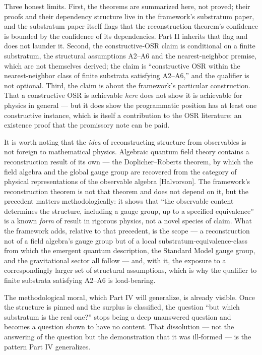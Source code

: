 \documentclass[
]{article}
\begin{document}
Three honest limits. First, the theorems are summarized here, not
proved; their proofs and their dependency structure live in the
framework's substratum paper, and the substratum paper itself flags that
the reconstruction theorem's confidence is bounded by the confidence of
its dependencies. Part II inherits that flag and does not launder it.
Second, the constructive-OSR claim is conditional on a finite
substratum, the structural assumptions A2--A6 and the nearest-neighbor
premise, which are not themselves derived; the claim is ``constructive
OSR within the nearest-neighbor class of finite substrata satisfying
A2--A6,'' and the qualifier is not optional. Third, the claim is about
the framework's particular construction. That a constructive OSR is
achievable \emph{here} does not show it is achievable for physics in
general --- but it does show the programmatic position has at least one
constructive instance, which is itself a contribution to the OSR
literature: an existence proof that the promissory note can be paid.

It is worth noting that the \emph{idea} of reconstructing structure from
observables is not foreign to mathematical physics. Algebraic quantum
field theory contains a reconstruction result of its own --- the
Doplicher--Roberts theorem, by which the field algebra and the global
gauge group are recovered from the category of physical representations
of the observable algebra {[}Halvorson{]}. The framework's
reconstruction theorem is not that theorem and does not depend on it,
but the precedent matters methodologically: it shows that ``the
observable content determines the structure, including a gauge group, up
to a specified equivalence'' is a known \emph{form} of result in
rigorous physics, not a novel species of claim. What the framework adds,
relative to that precedent, is the scope --- a reconstruction not of a
field algebra's gauge group but of a local substratum-equivalence-class
from which the emergent quantum description, the Standard Model gauge
group, and the gravitational sector all follow --- and, with it, the
exposure to a correspondingly larger set of structural assumptions,
which is why the qualifier to finite substrata satisfying A2--A6 is
load-bearing.

The methodological moral, which Part IV will generalize, is already
visible. Once the structure is pinned and the surplus is classified, the
question ``but which substratum is the real one?'' stops being a deep
unanswered question and becomes a question shown to have no content.
That dissolution --- not the answering of the question but the
demonstration that it was ill-formed --- is the pattern Part IV
generalizes.
\end{document}

